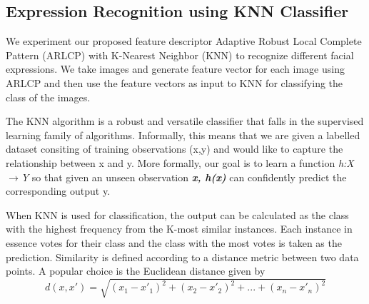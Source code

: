 \documentclass[12pt]{article}
\begin{document}
\subsection{Expression Recognition using KNN Classifier}
We experiment our proposed feature descriptor Adaptive Robust Local Complete Pattern (ARLCP) with K-Nearest Neighbor (KNN) to recognize different facial expressions. We take images and generate feature vector for each image using ARLCP and then use the feature vectors as input to KNN for classifying the class of the images.

The KNN algorithm is a robust and versatile classifier that falls in the supervised learning family of algorithms. Informally, this means that we are given a labelled dataset consiting of training observations (x,y) and would like to capture the relationship between x and y. More formally, our goal is to learn a function \textit{h:X$\rightarrow$Y} so that given an unseen observation \textit{\textbf{x, h(x)}} can confidently predict the corresponding output y.

When KNN is used for classification, the output can be calculated as the class with the highest frequency from the K-most similar instances. Each instance in essence votes for their class and the class with the most votes is taken as the prediction. Similarity is defined according to a distance metric between two data points. A popular choice is the Euclidean distance given by
\begin{equation}
d(x,x')=\sqrt{(x_1-x'_1)^2+(x_2-x'_2)^2+...+(x_n-x'_n)^2}
\end{equation}
\end{document}
